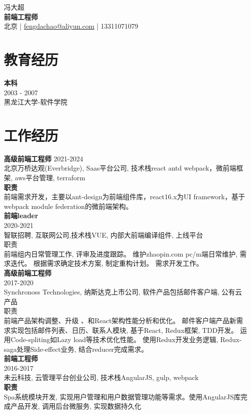 \documentclass[a4paper,9pt]{extarticle}
\begin{document}
\pagestyle{empty}

\begin{center}
冯大超\\[3pt] %
\textbf{前端工程师}\\[1pt] %
北京 | \href{mailto:fengdachao@aliyun.com}{fengdachao@aliyun.com} | 13311071079 %
\end{center}


\section*{教育经历}
\noindent
\newline
\textbf{本科} \\
2003 - 2007 \\ 
黑龙江大学-软件学院 \\


\section*{工作经历}
\noindent
\newline
\noindent
\textbf{高级前端工程师}
2021-2024 \\
北京万桥达观(Everbridge), Saas平台公司, 技术栈react antd webpack，微前端框架, aws平台管理, terraform \\
\textbf{职责} \\
前端需求开发，主要以ant-design为前端组件库，react16.x为UI framework，基于webpack module federation的微前端架构。 \\

\noindent
\textbf{前端leader} \\
2020-2021 \\
智联招聘, 互联网公司,技术栈VUE, 内部大前端编译组件, 上线平台 \\ 
职责\\
前端组内日常管理工作, 评审及进度跟踪。 维护zhaopin.com pc/m端日常维护, 需求迭代。 根据需求确定技术方案, 制定重构计划。 需求开发工作。 \\ 

\noindent
\textbf{高级前端工程师} \\
2017-2020 \\
Synchronoss Technologies, 纳斯达克上市公司, 软件产品包括邮件客户端, 公有云产品 \\
职责\\
前端产品架构调整、升级 、和React架构性能分析和优化。 邮件客户端产品新需求实现包括邮件列表、日历、联系人模块, 基于React, Redux框架, TDD开发。 运用Code-spliting如Lazy load等技术优化性能。 使用Redux开发业务逻辑, Redux-saga处理Side-effect业务, 结合reducer完成需求。\\

\noindent
\textbf{前端工程师} \\
2016-2017  \\
未云科技, 云管理平台创业公司, 技术栈AngularJS, gulp, webpack\\
\textbf{职责} \\
Spa系统模块开发, 实现用户管理和用户数据管理功能等需求。使用AngularJS库完成产品开发, 调用后台微服务, 实现数据持久化 \\


\end{document}
